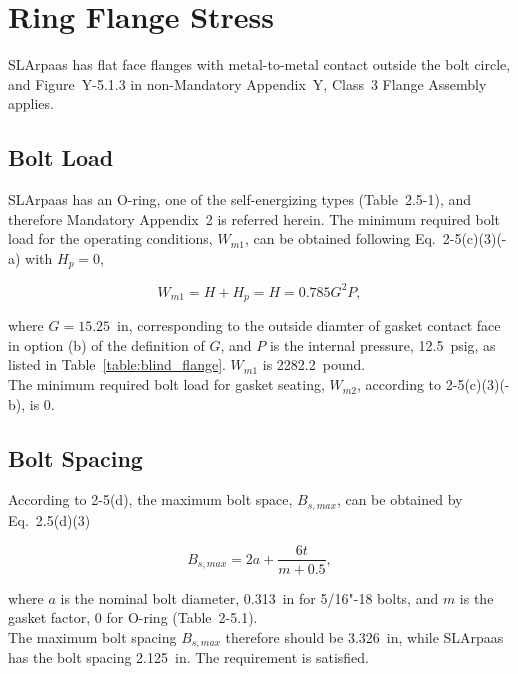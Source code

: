 \section{Ring Flange Stress}
\label{app:ring_flange}

SLArpaas has flat face flanges with metal-to-metal contact outside the bolt
circle, and Figure~Y-5.1.3 in non-Mandatory Appendix~Y, Class~3 Flange Assembly
applies.

\subsection{Bolt Load}
\label{app:bolt_load}

SLArpaas has an O-ring, one of the self-energizing types (Table~2.5-1),
and therefore Mandatory Appendix~2 is referred herein.
The minimum required bolt load for the operating conditions,
$W_{m1}$, can be obtained following Eq.~2-5(c)(3)(-a) with $H_p = 0$,

\begin{equation}
    W_{m1} = H + H_p = H = 0.785G^2 P,
\end{equation}

where $G = 15.25$~in, corresponding to the outside diamter of gasket contact
face in option (b) of the definition of $G$,
and $P$ is the internal pressure, 12.5~psig, as listed in 
Table~\ref{table:blind_flange}.
$W_{m1}$ is 2282.2~pound.\\

The minimum required bolt load for gasket seating, $W_{m2}$, according to
2-5(c)(3)(-b), is 0.

\subsection{Bolt Spacing}
\label{app:bolt_spacing}

According to 2-5(d), the maximum bolt space, $B_{s,max}$, can be obtained
by Eq.~2.5(d)(3)

\begin{equation}
    B_{s,max} = 2a + \frac{6t}{m+0.5},
\end{equation}

where $a$ is the nominal bolt diameter, 0.313~in for 5/16"-18 bolts,
and $m$ is the gasket factor, 0 for O-ring (Table~2-5.1).\\

The maximum bolt spacing $B_{s,max}$ therefore should be 3.326~in,
while SLArpaas has the bolt spacing 2.125~in.
The requirement is satisfied.
